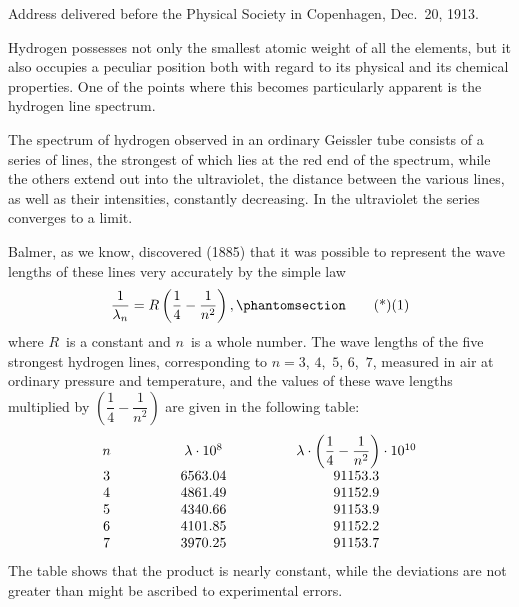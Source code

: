   {Address delivered before the Physical Society in Copenhagen, Dec.~20, 1913.}

 Hydrogen possesses not only the
smallest atomic weight of all the elements, but it also occupies a
peculiar position both with regard to its physical and its chemical
properties. One of the points where this becomes particularly apparent
is the hydrogen line spectrum.

The spectrum of hydrogen observed in an ordinary Geissler tube
consists of a series of lines, the strongest of which lies at the red
end of the spectrum, while the others extend out into the ultra\Add{-}violet,
the distance between the various lines, as well as their intensities,
constantly decreasing. In the ultra\Add{-}violet the series converges
to a limit.

Balmer, as we know, discovered (1885) that it was possible to
represent the wave lengths of these lines very accurately by the
simple law
\[
\frac{1}{\lambda_{n}} = R \left(\frac{1}{4} - \frac{1}{n^{2}}\right),
\Tag{(1)}
\]
where $R$~is a constant and $n$~is a whole number. The wave lengths
of the five strongest hydrogen lines, corresponding to $n = 3$, $4$,~$5$, $6$,~$7$,
measured in air at ordinary pressure and temperature, and the
values of these wave lengths multiplied by $\left(\dfrac{1}{4} - \dfrac{1}{n^{2}}\right)$ are given in
the following table:
\[
\begin{array}{*{2}{c<{\qquad\qquad}}c}
n & \lambda \cdot 10^{8} & \lambda \cdot \left(\dfrac{1}{4} - \dfrac{1}{n^{2}}\right) \cdot 10^{10} \\
3 & 6563.04 & 91153.3 \\
4 & 4861.49 & 91152.9 \\
5 & 4340.66 & 91153.9 \\
6 & 4101.85 & 91152.2 \\
7 & 3970.25 & 91153.7 \\
\end{array}
\]
The table shows that the product is nearly constant, while the deviations
are not greater than might be ascribed to experimental errors.

